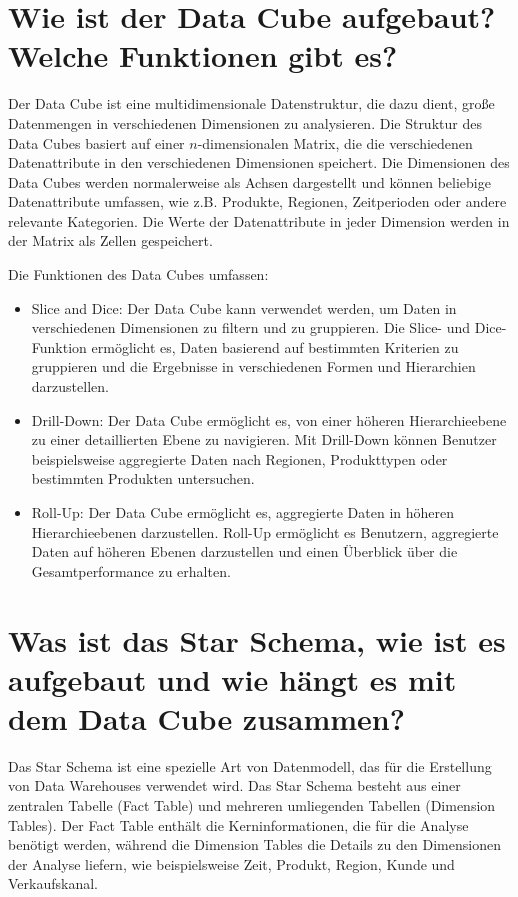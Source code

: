 \documentclass{article}
\begin{document}
	\section*{Wie ist der Data Cube aufgebaut? Welche Funktionen gibt es?}
	Der Data Cube ist eine multidimensionale Datenstruktur, die dazu dient, große Datenmengen in verschiedenen Dimensionen zu analysieren. Die Struktur des Data Cubes basiert auf einer $n$-dimensionalen Matrix, die die verschiedenen Datenattribute in den verschiedenen Dimensionen speichert. Die Dimensionen des Data Cubes werden normalerweise als Achsen dargestellt und können beliebige Datenattribute umfassen, wie z.B. Produkte, Regionen, Zeitperioden oder andere relevante Kategorien. Die Werte der Datenattribute in jeder Dimension werden in der Matrix als Zellen gespeichert.
	
	Die Funktionen des Data Cubes umfassen:
	\begin{itemize}
		\item Slice and Dice: Der Data Cube kann verwendet werden, um Daten in verschiedenen Dimensionen zu filtern und zu gruppieren. Die Slice- und Dice-Funktion ermöglicht es, Daten basierend auf bestimmten Kriterien zu gruppieren und die Ergebnisse in verschiedenen Formen und Hierarchien darzustellen.
		\item Drill-Down: Der Data Cube ermöglicht es, von einer höheren Hierarchieebene zu einer detaillierten Ebene zu navigieren. Mit Drill-Down können Benutzer beispielsweise aggregierte Daten nach Regionen, Produkttypen oder bestimmten Produkten untersuchen.
		\item Roll-Up: Der Data Cube ermöglicht es, aggregierte Daten in höheren Hierarchieebenen darzustellen. Roll-Up ermöglicht es Benutzern, aggregierte Daten auf höheren Ebenen darzustellen und einen Überblick über die Gesamtperformance zu erhalten.
	\end{itemize}
	
	\section*{Was ist das Star Schema, wie ist es aufgebaut und wie hängt es mit dem Data Cube zusammen?}
	Das Star Schema ist eine spezielle Art von Datenmodell, das für die Erstellung von Data Warehouses verwendet wird. Das Star Schema besteht aus einer zentralen Tabelle (Fact Table) und mehreren umliegenden Tabellen (Dimension Tables). Der Fact Table enthält die Kerninformationen, die für die Analyse benötigt werden, während die Dimension Tables die Details zu den Dimensionen der Analyse liefern, wie beispielsweise Zeit, Produkt, Region, Kunde und Verkaufskanal.
	
\end{document}
